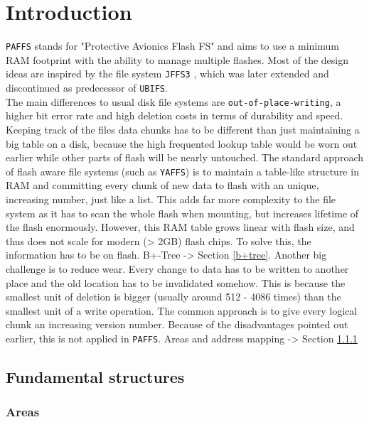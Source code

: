 
\chapter{Introduction}
\label{cha:introduction}

\texttt{PAFFS} stands for "Protective Avionics Flash FS" and aims to use a minimum RAM footprint with the ability to manage multiple flashes. Most of the design ideas are inspired by the file system \texttt{JFFS3} , which was later extended  and discontinued as predecessor of \texttt{UBIFS}.\\
The main differences to usual disk file systems are \texttt{out-of-place-writing}, a higher bit error rate and high deletion costs in terms of durability and speed. Keeping track of the files data chunks has to be different than just maintaining a big table on a disk, because the high frequented lookup table would be worn out earlier while other parts of flash will be nearly untouched. The standard approach of flash aware file systems (such as \texttt{YAFFS}) is to maintain a table-like structure in RAM and committing every chunk of new data to flash with an unique, increasing number, just like a list. This adds far more complexity to the file system as it has to scan the whole flash when mounting, but increases lifetime of the flash enormously. However, this RAM table grows linear with flash size, and thus does not scale for modern (> 2GB) flash chips. To solve this, the information has to be on flash. B+-Tree -> Section \ref{b+tree}.
Another big challenge is to reduce wear. Every change to data has to be written to another place and the old location has to be invalidated somehow. This is because the smallest unit of deletion is bigger (usually around 512 - 4086 times) than the smallest unit of a write operation. The common approach is to give every logical chunk an increasing version number. Because of the disadvantages pointed out earlier, this is not applied in \texttt{PAFFS}. Areas and address mapping -> Section \ref{areas}

\section{Fundamental structures}
\label{sec:funst}


\subsection{Areas}
\label{areas}
